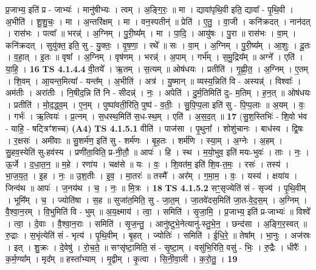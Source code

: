\documentclass[17pt]{extarticle}
\begin{document}
                  प्र॒जाभ्य॒ इति॑ प्र - जाभ्यः॑ । मानु॑षीभ्यः । त्वम् । अ॒ङ्गि॒रः॒ ॥ मा । द्यावा॑पृथि॒वी इति॒ द्यावा᳚ - पृ॒थि॒वी । अ॒भीति॑ । शू॒शु॒चः॒ । मा । अ॒न्तरि॑क्षम् । मा । वन॒स्पतीन्॑ ॥ प्रेति॑ । ए॒तु॒ । वा॒जी । कनि॑क्रदत् । नान॑दत् । रास॑भः । पत्वा᳚ ॥ भरन्न्॑ । अ॒ग्निम् । पु॒री॒ष्य᳚म् । मा । पा॒दि॒ । आयु॑षः । पु॒रा ॥ रास॑भः । वा॒म् । कनि॑क्रदत् । सुयु॑क्त॒ इति॒ सु - यु॒क्तः॒ । वृ॒ष॒णा॒ । रथे᳚ ॥ सः । वा॒म् । अ॒ग्निम् । पु॒री॒ष्य᳚म् । आ॒शुः । दू॒तः । व॒हा॒त् । इ॒तः ॥ वृषा᳚ । अ॒ग्निम् । वृष॑णम् । भरन्न्॑ । अ॒पाम् । गर्भ᳚म् । स॒मु॒द्रिय᳚म् ॥ अग्ने᳚ । एति॑ । या॒हि॒ । \textbf{  16} \newline
                  \newline
                                \textbf{ TS 4.1.4.4} \newline
                  वी॒तये᳚ । ऋ॒तम् । स॒त्यम् ॥ ओष॑धयः । प्रतीति॑ । गृ॒ह्णी॒त॒ । अ॒ग्निम् । ए॒तम् । शि॒वम् । आ॒यन्त॒मित्या᳚ - यन्त᳚म् । अ॒भीति॑ । अत्र॑ । यु॒ष्मान् ॥ व्यस्य॒न्निति॑ वि - अस्यन्न्॑ । विश्वाः᳚ । अम॑तीः । अरा॑तीः । नि॒षीद॒न्नि ति॑ नि - सीदन्न्॑ । नः॒ । अपेति॑ । दु॒र्म॒तिमिति॑ दुः- म॒तिम् । ह॒न॒त् ॥ ओष॑धयः । प्रतीति॑ । मो॒द॒द्ध्व॒म् । ए॒न॒म् । पुष्पा॑वती॒रिति॒ पुष्प॑ - व॒तीः॒ । सु॒पि॒प्प॒ला इति॑ सु - पि॒प्प॒लाः ॥ अ॒यम् । वः॒ । गर्भः॑ । ऋ॒त्वियः॑ । प्र॒त्नम् । स॒धस्थ॒मिति॑ स॒ध-स्थ॒म् । एति॑ । अ॒स॒द॒त् ॥ \textbf{  17} \newline
                  \newline
                      (सु॒श॒स्तिभिः॑ - शि॒वो भ॑व - याहि॒ - षट्त्रिꣳ॑शच्च)  \textbf{(A4)} \newline \newline
                                \textbf{ TS 4.1.5.1} \newline
                  वीति॑ । पाज॑सा । पृ॒थुना᳚ । शोशु॑चानः । बाध॑स्व । द्वि॒षः । र॒क्षसः॑ । अमी॑वाः ॥ सु॒शर्म॑ण॒ इति॑ सु - शर्म॑णः । बृ॒ह॒तः । शर्म॑णि । स्या॒म् । अ॒ग्नेः । अ॒हम् । सु॒हव॒स्येति॑ सु-हव॑स्य । प्रणी॑ता॒विति॒ प्र-नी॒तौ॒ ॥ आपः॑ । हि । स्थ । म॒यो॒भुव॒ इति॑ मयः-भुवः॑ । ताः । नः॒ । ऊ॒र्जे । द॒धा॒त॒न॒ ॥ म॒हे । रणा॑य । चक्ष॑से ॥ यः । वः॒ । शि॒वत॑म॒ इति॑ शि॒व-त॒मः॒ । रसः॑ । तस्य॑ । भा॒ज॒य॒त॒ । इ॒ह । नः॒ ॥ उ॒श॒तीः । इ॒व॒ । मा॒तरः॑ ॥ तस्मै᳚ । अर᳚म् । ग॒मा॒म॒ । वः॒ । यस्य॑ । क्षया॑य । जिन्व॑थ ॥ आपः॑ । ज॒नय॑थ । च॒ । नः॒ ॥ मि॒त्रः । \textbf{  18} \newline
                  \newline
                                \textbf{ TS 4.1.5.2} \newline
                  सꣳ॒॒सृज्येति॑ सं - सृज्य॑ । पृ॒थि॒वीम् । भूमि᳚म् । च॒ । ज्योति॑षा । स॒ह ॥ सुजा॑त॒मिति॒ सु - जा॒त॒म् । जा॒तवे॑दस॒मिति॑ जा॒त-वे॒द॒स॒म् । अ॒ग्निम् । वै॒श्वा॒न॒रम् । वि॒भुमिति॑ वि - भुम् ॥ अ॒य॒क्ष्माय॑ । त्वा॒ । समिति॑ । सृ॒जा॒मि॒ । प्र॒जाभ्य॒ इति॑ प्र-जाभ्यः॑ ॥ विश्वे᳚ । त्वा॒ । दे॒वाः । वै॒श्वा॒न॒राः । समिति॑ । सृ॒ज॒न्तु॒ । आनु॑ष्टुभे॒नेत्यानु॑-स्तु॒भे॒न॒ । छन्द॑सा । अ॒ङ्गि॒र॒स्वत् ॥ रु॒द्राः । स॒भृंत्येति॑ सं - भृत्य॑ । पृ॒थि॒वीम् । बृ॒हत् । ज्योतिः॑ । समिति॑ । ई॒धि॒रे॒ ॥ तेषा᳚म् । भा॒नुः । अज॑स्रः । इत् । शु॒क्रः । दे॒वेषु॑ । रो॒च॒ते॒ ॥ सꣳसृ॑ष्टा॒मिति॒ सं - सृ॒ष्टा॒म् । वसु॑भि॒रिति॒ वसु॑ - भिः॒ । रु॒द्रैः । धीरैः᳚ । क॒र्म॒ण्या᳚म् । मृद᳚म् ॥ हस्ता᳚भ्याम् । मृ॒द्वीम् । कृ॒त्वा । सि॒नी॒वा॒ली । क॒रो॒तु॒ । \textbf{  19} \newline
\end{document}
